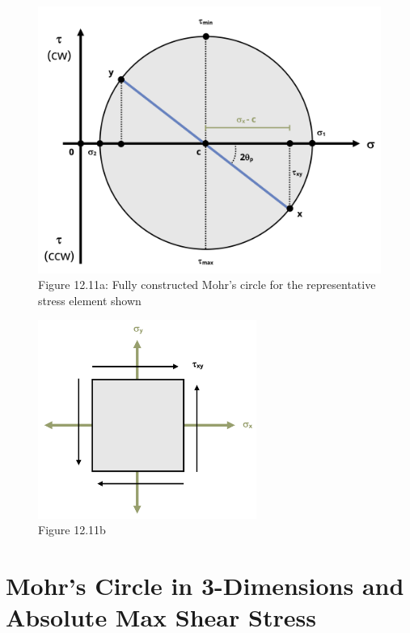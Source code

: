 \documentclass[
  letterpaper,
  DIV=11,
  numbers=noendperiod]{scrreprt}
\theoremstyle{definition}
\theoremstyle{remark}
\begin{document}
\begin{figure}[H]

{\centering \includegraphics[width=5.6875in,height=\textheight]{images/CH12 figures/figure 12.11 part 1.png}

}

\caption{Figure 12.11a: Fully constructed Mohr's circle for the
representative stress element shown}

\end{figure}%
\begin{figure}[H]

{\centering \includegraphics[width=2.8125in,height=\textheight]{images/CH12 figures/figure 12.11 part 2.png}

}

\caption{Figure 12.11b}

\end{figure}%

\section{Mohr's Circle in 3-Dimensions and Absolute Max Shear
Stress}\label{sec-12.4}
\end{document}
